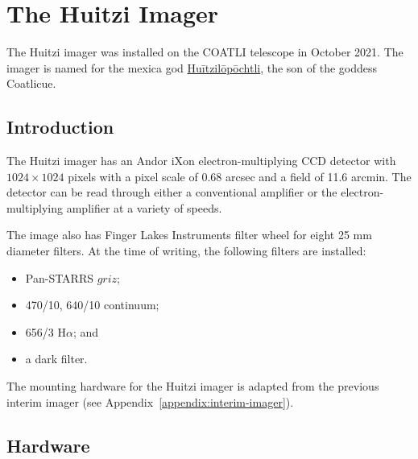\chapter{The Huitzi Imager}

The Huitzi imager was installed on the COATLI telescope in October 2021. The imager is named for the mexica god \href{https://en.wikipedia.org/wiki/Huītzilōpōchtli}{Huītzilōpōchtli}, the son of the goddess Coatlicue.

\section{Introduction}

The Huitzi imager has an Andor iXon electron-multiplying CCD detector with $1024\times1024$ pixels with a pixel scale of 0.68 arcsec and a field of 11.6 arcmin. The detector can be read through either a conventional amplifier or the electron-multiplying amplifier at a variety of speeds.

The image also has Finger Lakes Instruments filter wheel for eight 25 mm diameter filters. At the time of writing, the following filters are installed:
\begin{itemize}
    \item Pan-STARRS $griz$;
    \item 470/10, 640/10 continuum;
    \item 656/3 H$\alpha$; and
    \item a dark filter.
\end{itemize}

The mounting hardware for the Huitzi imager is adapted from the previous interim imager (see Appendix~\ref{appendix:interim-imager}).

\section{Hardware}


